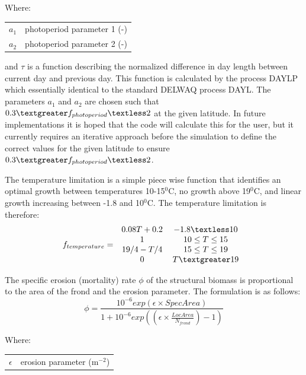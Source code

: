 \documentclass{deltares_manual}
\begin{document}
Where:\\

\begin{tabular}{ll}
	$a_1$    & photoperiod parameter 1 (-)\\
	$a_2$    & photoperiod parameter 2 (-)\\
\end{tabular}

and $\tau$ is a function describing the normalized difference in day length between current day and previous day. This function is calculated by the process DAYLP which essentially identical to the standard DELWAQ process DAYL. The parameters $a_1$ and $a_2$ are chosen such that $0.3 \textgreater f_{photoperiod} \textless 2$ at the given latitude. In future implementations it is hoped that the code will calculate this for the user, but it currently requires an iterative approach before the simulation to define the correct values for the given latitude to  ensure $0.3 \textgreater f_{photoperiod} \textless 2$.

The temperature limitation is a simple piece wise function that identifies an optimal growth between temperatures 10-15$^0$C, no growth above 19$^0$C, and linear growth increasing between -1.8 and 10$^0$C. The temperature limitation is therefore:
\begin{equation}
f_{temperature} =  
\left 
.\begin{tabular}{cc}
$ 0.08T + 0.2 $    & $-1.8 \textless 10$ \\
$  1 $             & $10 \leq T \leq 15$ \\
$19/4 - T/4$       & $15 \leq T \leq 19$ \\ 
$0$                & $T \textgreater 19$ \\
\end{tabular}
\right
.\end{equation}

The specific erosion (mortality) rate $\phi$ of the structural biomass is proportional to the area of the frond and the erosion parameter. The formulation is as follows:
\begin{equation}
\phi = \frac{10^{-6}exp(\epsilon\times SpecArea)}{1+10^{-6}exp((\epsilon\times \frac{LocArea}{N_{frond}})-1)}
\end{equation}

Where:\\
\begin{tabular}{ll}
$\epsilon$ & erosion parameter (m$^{-2}$)\\

\end{tabular}
\end{document}
